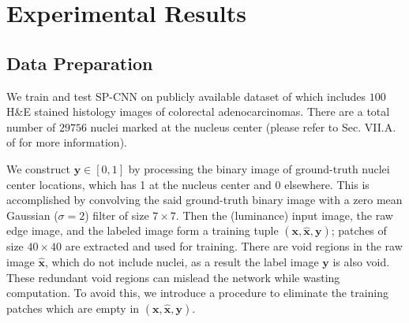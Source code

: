 \documentclass{article}
\begin{document}

\vspace{-5pt}
\section{Experimental Results}\vspace{-1mm}
\label{sec:experiments}
\subsection{Data Preparation}\vspace{-1pt}
\label{sec:data}
We train and test SP-CNN on publicly available dataset of \cite{SC_CNN} which includes $100$ H\&E stained histology images of colorectal adenocarcinomas. There are a total number of $29756$ nuclei marked at the nucleus center (please refer to Sec. VII.A. of \cite{SC_CNN} for more information).

We construct $\mathbf{y} \in [0,1]$ by processing the binary image of ground-truth nuclei center locations, which has 1 at the nucleus center and 0 elsewhere. This is accomplished by convolving the said ground-truth binary image with a zero mean Gaussian ($\sigma = 2$) filter of size $7 \times 7$. Then the (luminance) input image, the raw edge image, and the labeled image form a training tuple $(\mathbf{x}, \mathbf{\hat{x}}, \mathbf{y})$; patches of size $40\times 40$ are extracted and used for training. There are void regions in the raw image $\mathbf{\hat{x}}$, which do not include nuclei, as a result the label image $\mathbf{y}$ is also void. These redundant void regions can mislead the network while wasting computation. To avoid this, we introduce a procedure to eliminate the training patches which are empty in $(\mathbf{x}, \mathbf{\hat{x}}, \mathbf{y})$. %
\end{document}

